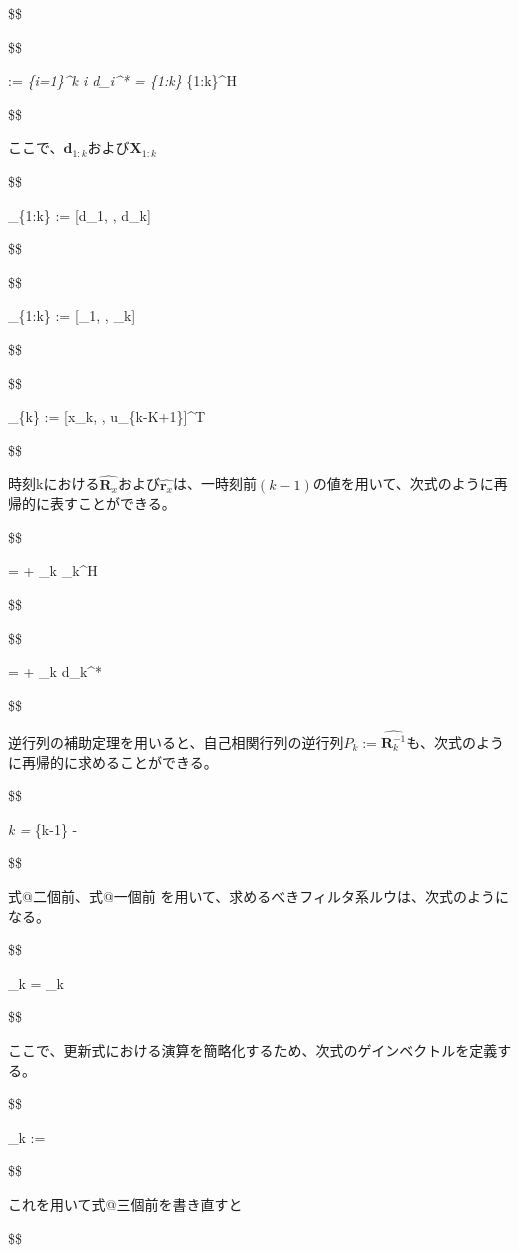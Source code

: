\$\$

\$\$

 := \sum\emph{\{i=1\}\^{}k \emph{i d\_i\^{}* =
}\{1:k\} }\{1:k\}\^{}H

\$\$

ここで、\(\bm{d}_{1:k}\)および\(\bm{X}_{1:k}\)

\$\$

\_\{1:k\} := {[}d\_1, \cdots, d\_k{]}

\$\$

\$\$

\_\{1:k\} := {[}\_1, \cdots, \_k{]}

\$\$

\$\$

\_\{k\} := {[}x\_k, \cdots, u\_\{k-K+1\}{]}\^{}T

\$\$

時刻kにおける\(\hat{\bm{R}_x}\)および\(\hat{\bm{r}_x}\)は、一時刻前\((k-1)\)の値を用いて、次式のように再帰的に表すことができる。

\$\$

 =  + \_k \_k\^{}H

\$\$

\$\$

 =  + \_k d\_k\^{}*

\$\$

逆行列の補助定理を用いると、自己相関行列の逆行列\(P_k := \hat{\bm{R}_k^{-1}}\)も、次式のように再帰的に求めることができる。

\$\$

\emph{k = }\{k-1\} -

\$\$

式@二個前、式@一個前
を用いて、求めるべきフィルタ系ルウは、次式のようになる。

\$\$

\_k = \_k 

\$\$

ここで、更新式における演算を簡略化するため、次式のゲインベクトルを定義する。

\$\$

\_k :=

\$\$

これを用いて式@三個前を書き直すと

\$\$

